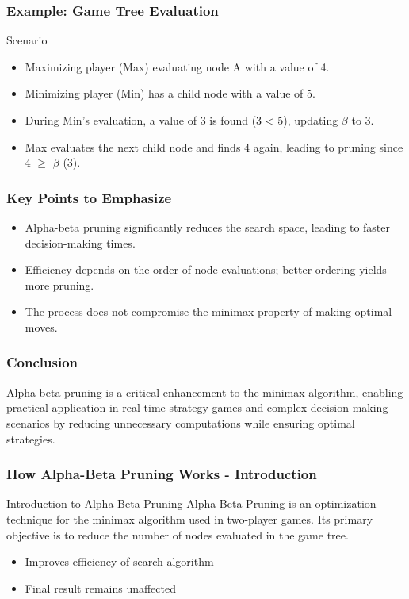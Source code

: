 \documentclass[aspectratio=169]{beamer}
\begin{document}
\begin{frame}[fragile]
    \frametitle{Example: Game Tree Evaluation}
    \begin{block}{Scenario}
        \begin{itemize}
            \item Maximizing player (Max) evaluating node A with a value of 4.
            \item Minimizing player (Min) has a child node with a value of 5.
            \item During Min's evaluation, a value of 3 is found (3 < 5), updating $\beta$ to 3.
            \item Max evaluates the next child node and finds 4 again, leading to pruning since 4 $\geq$ $\beta$ (3).
        \end{itemize}
    \end{block}
\end{frame}

\begin{frame}[fragile]
    \frametitle{Key Points to Emphasize}
    \begin{itemize}
        \item Alpha-beta pruning significantly reduces the search space, leading to faster decision-making times.
        \item Efficiency depends on the order of node evaluations; better ordering yields more pruning.
        \item The process does not compromise the minimax property of making optimal moves.
    \end{itemize}
\end{frame}

\begin{frame}[fragile]
    \frametitle{Conclusion}
    Alpha-beta pruning is a critical enhancement to the minimax algorithm, enabling practical application in real-time strategy games and complex decision-making scenarios by reducing unnecessary computations while ensuring optimal strategies.
\end{frame}

\begin{frame}[fragile]
    \frametitle{How Alpha-Beta Pruning Works - Introduction}
    \begin{block}{Introduction to Alpha-Beta Pruning}
        Alpha-Beta Pruning is an optimization technique for the minimax algorithm used in two-player games. Its primary objective is to reduce the number of nodes evaluated in the game tree.
    \end{block}
    \begin{itemize}
        \item Improves efficiency of search algorithm
        \item Final result remains unaffected
    \end{itemize}
\end{frame}
\end{document}
